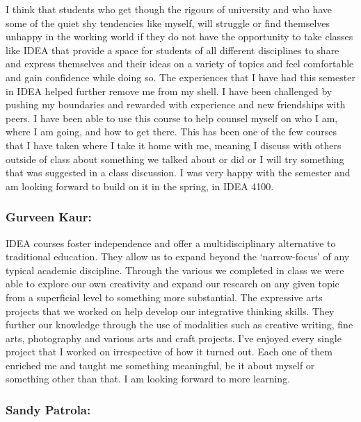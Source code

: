 \documentclass[letterpaper,10pt,headsepline]{scrreprt}
\begin{document}
I think that students who get though the rigours of university and who have some of the quiet shy tendencies like myself, will struggle or find themselves unhappy in the working world if they do not have the opportunity to take classes like IDEA that provide a space for students of all different disciplines to share and express themselves and their ideas on a variety of topics and feel comfortable and gain confidence while doing so. The experiences that I have had this semester in IDEA helped further remove me from my shell. I have been challenged by pushing my boundaries and rewarded with experience and new friendships with peers. I have been able to use this course to help counsel myself on who I am, where I am going, and how to get there. This has been one of the few courses that I have taken where I take it home with me, meaning I discuss with others outside of class about something we talked about or did or I will try something that was suggested in a class discussion. I was very happy with the semester and am looking forward to build on it in the spring, in IDEA 4100.

\subsubsection{Gurveen Kaur:}

IDEA courses foster independence and offer a multidisciplinary alternative to traditional education. They allow us to expand beyond the ‘narrow-focus’ of any typical academic discipline. Through the various we completed in class we were able to explore our own creativity and expand our research on any given topic from a superficial level to something more substantial. The expressive arts projects that we worked on help develop our integrative thinking skills. They further our knowledge through the use of modalities such as creative writing, fine arts, photography and various arts and craft projects. I’ve enjoyed every single project that I worked on irrespective of how it turned out. Each one of them enriched me and taught me something meaningful, be it about myself or something other than that. I am looking forward to more learning.

\subsubsection{Sandy Patrola:}
\end{document}
